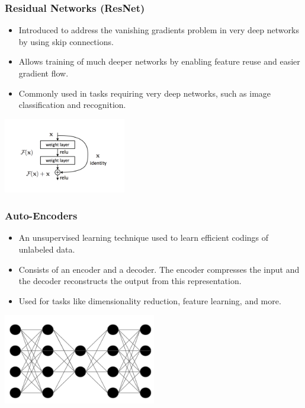 \documentclass[aspectratio=169]{../latex_main/tntbeamer}  %
\begin{document}
        \begin{frame}
        \frametitle{Residual Networks (ResNet)}
        \begin{itemize}
            \item Introduced to address the vanishing gradients problem in very deep networks by using skip connections.
            \item Allows training of much deeper networks by enabling feature reuse and easier gradient flow.
            \item Commonly used in tasks requiring very deep networks, such as image classification and recognition.
        \end{itemize}
        \centering
        \includegraphics[width=0.4\textwidth]{figures/resnet.png}
        \end{frame}

        \begin{frame}
        \frametitle{Auto-Encoders}
        \begin{itemize}
            \item An unsupervised learning technique used to learn efficient codings of unlabeled data.
            \item Consists of an encoder and a decoder. The encoder compresses the input and the decoder reconstructs the output from this representation.
            \item Used for tasks like dimensionality reduction, feature learning, and more.
        \end{itemize}
        \centering
        \includegraphics[width=0.5\textwidth]{figures/ae.png}
        \end{frame}
\end{document}

